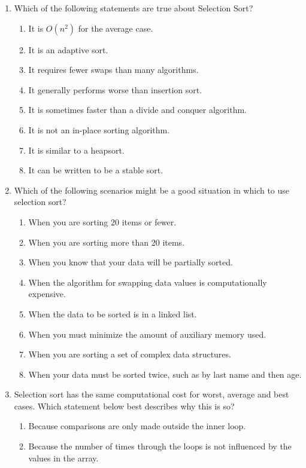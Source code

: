 \documentclass{article}
\begin{document}
\begin{enumerate}
\begin{enumerate}[label=\alph*.]
		\end{enumerate}
	\item Which of the following statements are true about Selection Sort?
		\begin{enumerate}[label=\alph*.]
			\item It is \(O(n^2 )\) for the average case.
			\item It is an adaptive sort.
			\item It requires fewer swaps than many algorithms.
			\item It generally performs worse than insertion sort.
			\item It is sometimes faster than a divide and conquer algorithm.
			\item It is not an in-place sorting algorithm.
			\item It is similar to a heapsort.
			\item It can be written to be a stable sort.
		\end{enumerate}
	\item Which of the following scenarios might be a good situation in which to use selection sort?
		\begin{enumerate}[label=\alph*.]
			\item When you are sorting 20 items or fewer.
			\item When you are sorting more than 20 items.
			\item When you know that your data will be partially sorted.
			\item When the algorithm for swapping data values is computationally expensive.
			\item When the data to be sorted is in a linked list.
			\item When you must minimize the amount of auxiliary memory used.
			\item When you are sorting a set of complex data structures.
			\item When your data must be sorted twice, such as by last name and then age.
		\end{enumerate}
	\item Selection sort has the same computational cost for worst, average and best cases. Which statement below best describes why this is so?
		\begin{enumerate}[label=\alph*.]
			\item Because comparisons are only made outside the inner loop.
			\item Because the number of times through the loops is not influenced by the values in the array.

\end{enumerate}
\end{enumerate}
\end{document}
